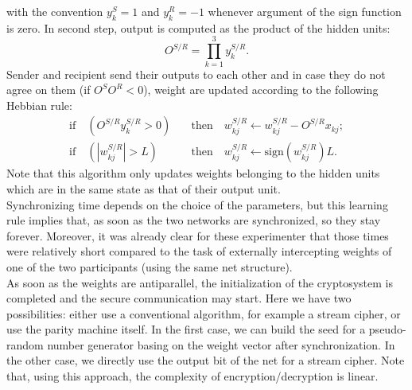 \documentclass[%
    corpo=11pt,
    twoside,
    stile=classica,
    oldstyle,
    autoretitolo,
    tipotesi=magistrale,
    greek,
    evenboxes,
    english
]{toptesi}
\newcommand{\sign}{\text{sign}}
\begin{document}
with the convention $y_k^S = 1$ and $y_k^R = -1$ whenever argument of the sign function is zero. In second step, output is computed as the product of the hidden units:
\begin{equation}
O^{S/R} = \prod_{k=1}^{3}y_k^{S/R}.
\end{equation} 
Sender and recipient send their outputs to each other and in case they do not agree on them (if $O^SO^R<0$), weight are updated according to the following Hebbian rule:
\begin{align}
\text{if} \quad \left(O^{S/R}y_k^{S/R}>0\right) \quad &\text{then} \quad w_{kj}^{S/R} \leftarrow w_{kj}^{S/R} -O^{S/R} x_{kj}; \nonumber \\
\text{if} \quad \left(|w_{kj}^{S/R}|>L\right) \quad &\text{then} \quad w_{kj}^{S/R} \leftarrow \sign\left(w_{kj}^{S/R}\right)L.
\label{hebblearn}
\end{align}
Note that this algorithm only updates weights belonging to the hidden units which are in the same state as that of their output unit. \\
Synchronizing time depends on the choice of the parameters, but this learning rule implies that, as soon as the two networks are synchronized, so they stay forever. Moreover, it was already clear for these experimenter that those times were relatively short compared to the task of externally intercepting weights of one of the two participants (using the same net structure). \\
As soon as the weights are antiparallel, the initialization of the cryptosystem is completed and the secure communication may start. Here we have two possibilities: either use a conventional algorithm, for example a stream cipher, or use the parity machine itself. In the first case, we can build the seed for a pseudo-random number generator basing on the weight vector after synchronization. In the other case, we directly use the output bit of the net for a stream cipher. Note that, using this approach, the complexity of encryption/decryption is linear. 
\end{document}
